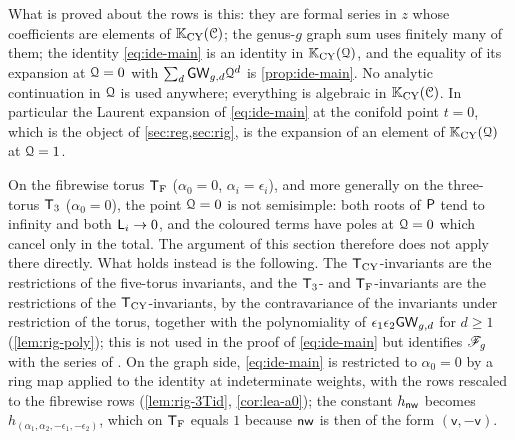 \begin{rmk}
\label{rmk:ide-scope}
What is proved about the rows is this: they are formal series in $z$ whose coefficients are elements of $\mathbb{K}_{\mathrm{CY}}(\mathcal{C})$; the genus-$g$ graph sum uses finitely many of them; the identity \cref{eq:ide-main} is an identity in $\mathbb{K}_{\mathrm{CY}}(\mathcal{Q})$, and the equality of its expansion at $\mathcal{Q}=0$ with $\sum_d\mathsf{GW}_{g,d}\mathcal{Q}^d$ is \cref{prop:ide-main}. No analytic continuation in $\mathcal{Q}$ is used anywhere; everything is algebraic in $\mathbb{K}_{\mathrm{CY}}(\mathcal{C})$. In particular the Laurent expansion of \cref{eq:ide-main} at the conifold point $t=0$, which is the object of \cref{sec:reg,sec:rig}, is the expansion of an element of $\mathbb{K}_{\mathrm{CY}}(\mathcal{Q})$ at $\mathcal{Q}=1$.

On the fibrewise torus $\mathsf{T}_{\mathrm{F}}$ ($\alpha_0=0$, $\alpha_i=\epsilon_i$), and more generally on the three-torus $\mathsf{T}_{3}$ ($\alpha_0=0$), the point $\mathcal{Q}=0$ is not semisimple: both roots of $\mathsf{P}$ tend to infinity and both $\mathsf{L}_i\to 0$, and the coloured terms have poles at $\mathcal{Q}=0$ which cancel only in the total. The argument of this section therefore does not apply there directly. What holds instead is the following. The $\mathsf{T}_{\mathrm{CY}}$-invariants are the restrictions of the five-torus invariants, and the $\mathsf{T}_{3}$- and $\mathsf{T}_{\mathrm{F}}$-invariants are the restrictions of the $\mathsf{T}_{\mathrm{CY}}$-invariants, by the contravariance of the invariants under restriction of the torus, together with the polynomiality of $\epsilon_1\epsilon_2\mathsf{GW}_{g,d}$ for $d\geq 1$ (\cref{lem:rig-poly});  this is not used in the proof of \cref{eq:ide-main} but identifies $\mathscr{F}_g$ with the series of \cite{BS}. On the graph side, \cref{eq:ide-main} is restricted to $\alpha_0=0$ by a ring map applied to the identity at indeterminate weights, with the rows rescaled to the fibrewise rows (\cref{lem:rig-3Tid}, \cref{cor:lea-a0}); the constant $h_{\mathsf{nw}}$ becomes $h_{(\alpha_1,\alpha_2,-\epsilon_1,-\epsilon_2)}$, which on $\mathsf{T}_{\mathrm{F}}$ equals $1$ because $\mathsf{nw}$ is then of the form $(\mathsf{v},-\mathsf{v})$.
\end{rmk}

